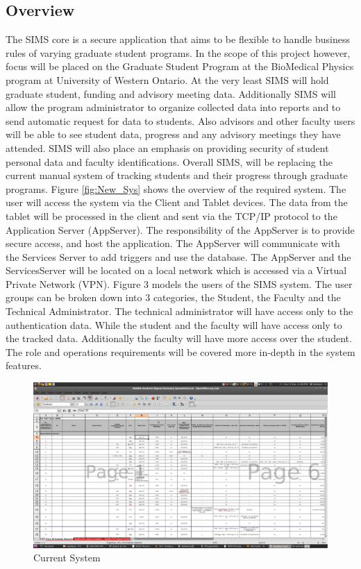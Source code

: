 \documentclass[11pt,a4paper]{report}
\begin{document}
\subsection{ Overview }
The SIMS core is a secure application that aims to be flexible to handle business rules of varying graduate
student programs. In the scope of this project however, focus will be placed on the Graduate Student
Program at the BioMedical Physics program at University of Western Ontario. At the very least SIMS
will hold graduate student, funding and advisory meeting data. Additionally SIMS will allow the program
administrator to organize collected data into reports and to send automatic request for data to students.
Also advisors and other faculty users will be able to see student data, progress and any advisory meetings
they have attended. SIMS will also place an emphasis on providing security of student personal data and
faculty identifications. Overall SIMS, will be replacing the current manual system of tracking students and
their progress through graduate programs.
Figure \ref{fig:New_Sys} shows the overview of the required system. The user will access the system via the Client and
Tablet devices. The data from the tablet will be processed in the client and sent via the TCP/IP protocol
to the Application Server (AppServer). The responsibility of the AppServer is to provide secure access, and
host the application. The AppServer will communicate with the Services Server to add triggers and use the
database. The AppServer and the ServicesServer will be located on a local network which is accessed via
a Virtual Private Network (VPN). Figure 3 models the users of the SIMS system. The user groups can be
broken down into 3 categories, the Student, the Faculty and the Technical Administrator. The technical
administrator will have access only to the authentication data. While the student and the faculty will have
access only to the tracked data. Additionally the faculty will have more access over the student. The role
and operations requirements will be covered more in-depth in the system features.
\begin{figure}[htp]
\centering
\includegraphics[scale=0.25]{diagrams/Current_System.png}
\caption{Current System}
\label{fig:Curr_Sys}
\end{figure}
\end{document}
